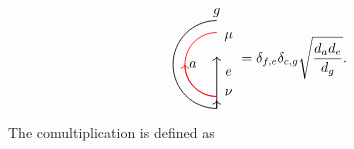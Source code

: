 \documentclass[a4paper,11pt]{article}
\theoremstyle{theorem}
\theoremstyle{remark}
\begin{document}
\begin{equation}
\begin{aligned}
\begin{tikzpicture}
        \draw[line width=0.6pt,black,->] (0,-1.1)--(0,-0.9);
        \draw[line width=0.6pt,black,->] (0,-1.1)--(0,0.2);
        \draw[red, line width=0.6pt] (0,0.8) arc[start angle=90, end angle=270, radius=0.8];
           \draw[red, line width=0.6pt, ->] (0,-0.8) arc[start angle=270, end angle=180, radius=0.8];
 \draw[black, line width=0.6pt] (0,-1.1) arc[start angle=-90, end angle=-270, radius=1.1];
        \node[line width=0.6pt, dashed, draw opacity=0.5] at (0,1.3) {$g$};
        \node[line width=0.6pt, dashed, draw opacity=0.5] at (-0.6,0) {$a$};
        \node[line width=0.6pt, dashed, draw opacity=0.5] at (0.3,-0.7) {$\nu$};
        \node[line width=0.6pt, dashed, draw opacity=0.5] at (0.3,-0.2) {$e$};
        \node[line width=0.6pt, dashed, draw opacity=0.5] at (0.3,0.7) {$\mu$};
    \end{tikzpicture}
\end{aligned} = \delta_{f,e} \delta_{c,g} \sqrt{\frac{d_a d_e}{d_g}}
.
\end{equation}
The comultiplication is defined as
\end{document}
